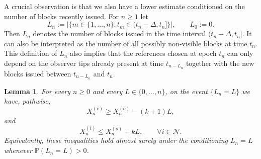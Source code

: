 \documentclass[a4paper,12pt,oneside,reqno]{amsart}
\newcommand{\Nodes}{{\mathcal N}}
\renewcommand{\P}{{\mathbb P}}
\newcommand{\1}{{\mathbf 1}}
\newtheorem{lem}[theo]{Lemma}
\begin{document}
A crucial observation is that we also have a lower estimate conditioned on the number of blocks recently issued. For $n\ge 1$ let
\[
   L_n := \lvert\{m\in\{1,\ldots,n\}: t_m\in(t_n-\Delta,t_n]\}\rvert,
   \qquad
   L_0:=0.
\]
Then $L_n$ denotes the number of blocks issued in the time interval $(t_n-\Delta,t_n]$. It can also be interpreted as the number of all possibly non-visible blocks at time $t_n$. This definition of $L_n$ also implies that the references chosen at epoch $t_n$ can only depend on the observer tips already present at time $t_{n-L_n}$ together with the new blocks issued between $t_{n-L_n}$ and $t_n$.

\begin{lem}\label{lem:X_nX_nc}
For every $n\ge0$ and every $L\in\{0,\ldots,n\}$, on the event $\{L_n=L\}$ we have, pathwise,
\begin{equation}
     X_n^{(c)}\geq X_n^{(o)}-(k+1)L,
\end{equation}
and
\begin{equation}
     X_n^{(i)}\leq X_n^{(o)}+kL,\qquad \forall i\in\Nodes.
\end{equation}
Equivalently, these inequalities hold almost surely under the conditioning $L_n=L$ whenever $\P(L_n=L)>0$.
\end{lem}
\end{document}
